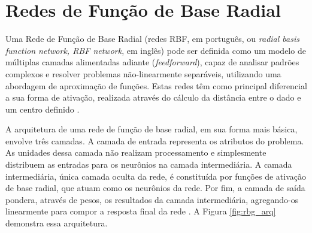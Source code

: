 \documentclass[msc, classic, a4paper]{ufbathesis}
\begin{document}



\section{Redes de Função de Base Radial}

Uma Rede de Função de Base Radial (redes RBF, em português,  ou \textit{radial basis function network, RBF network}, em inglês) pode ser definida como um modelo de múltiplas camadas alimentadas adiante (\textit{feedforward}),
capaz de analisar padrões complexos e resolver problemas não-linearmente separáveis, utilizando uma abordagem de aproximação de funções.
Estas redes têm como principal diferencial a sua forma de ativação, realizada através do cálculo da distância entre o dado e um centro definido \cite{Braga:RedesNeuraisTeoriaAplicacoes}.

A arquitetura de uma rede de função de base radial, em sua forma mais básica, envolve três camadas.
A camada de entrada representa os atributos do problema. As unidades dessa camada não realizam processamento e simplesmente distribuem as entradas para os neurônios na camada intermediária.
A camada intermediária, única camada oculta da rede, é constituída por funções de ativação de base radial, que atuam como os neurônios da rede.
Por fim, a camada de saída pondera, através de pesos, os resultados da camada intermediária, agregando-os linearmente para compor a resposta final da rede \cite{Rojas:1996:NNS:235222}.
A Figura \ref{fig:rbg_arq} demonstra essa arquitetura.
\end{document}

